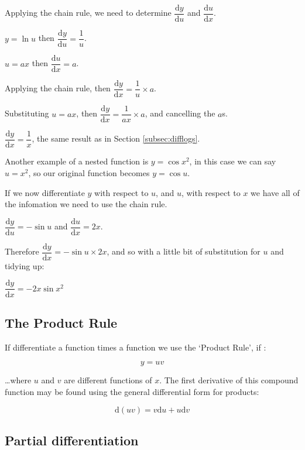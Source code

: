 \documentclass[
]{book}
\begin{document}
Applying the chain rule, we need to determine \(\dfrac{\textrm{d}y}{\textrm{d}u}\) and \(\dfrac{\textrm{d}u}{\textrm{d}x}\).

\(y = \ln u\) then \(\dfrac{\textrm{d}y}{\textrm{d}u} = \dfrac{1}{u}\).

\(u=ax\) then \(\dfrac{\textrm{d}u}{\textrm{d}x}=a\).

Applying the chain rule, then \(\dfrac{\textrm{d}y}{\textrm{d}x}=\dfrac{1}{u} \times a\).

Substituting \(u = ax\), then \(\dfrac{\textrm{d}y}{\textrm{d}x}=\dfrac{1}{ax} \times a\), and cancelling the \(a\)s.

\(\dfrac{\textrm{d}y}{\textrm{d}x}=\dfrac{1}{x}\), the same result as in Section \ref{subsec:difflogs}.

Another example of a nested function is \(y=\cos x^2\), in this case we can say \(u=x^2\), so our original function becomes \(y=\cos u\).

If we now differentiate \(y\) with respect to \(u\), and \(u\), with respect to \(x\) we have all of the infomation we need to use the chain rule.

\(\dfrac{\textrm{d}y}{\textrm{d}u} = -\sin u\) and \(\dfrac{\textrm{d}u}{\textrm{d}x}=2x\).

Therefore \(\dfrac{\textrm{d}y}{\textrm{d}x} = -\sin u \times 2x\), and so with a little bit of substitution for \(u\) and tidying up:

\(\dfrac{\textrm{d}y}{\textrm{d}x} = -2x\sin x^2\)

\hypertarget{subsec:productrule}{%
\subsection{The Product Rule}\label{subsec:productrule}}

If differentiate a function times a function we use the `Product Rule', if :

\begin{equation*}
y= uv
\end{equation*}

\ldots where \(u\) and \(v\) are different functions of \(x\). The first derivative of this compound function may be found using the general differential form for products:

\begin{equation}
\textrm{d}(uv) = v\textrm{d}u + u\textrm{d}v
\label{eq:productrule}
\end{equation}

\hypertarget{subsec:partial}{%
\subsection{Partial differentiation}\label{subsec:partial}}
\end{document}
